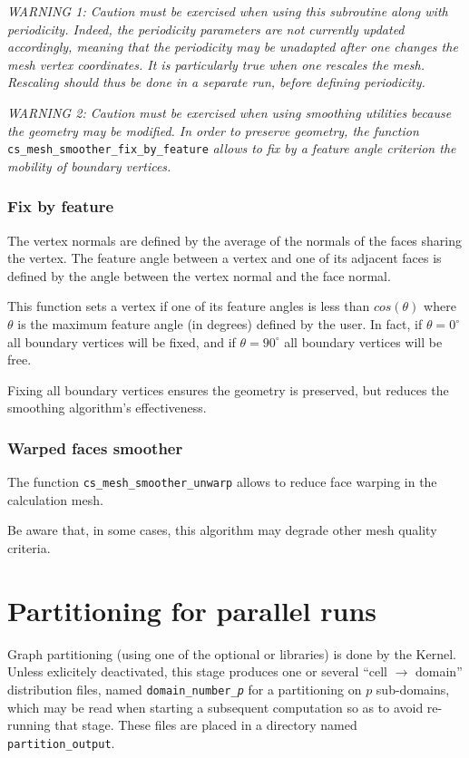 {{{\em WARNING 1: Caution must be exercised when using this subroutine
along with periodicity. Indeed, the periodicity parameters are not
currently updated accordingly, meaning that the periodicity may be
unadapted after one changes the mesh vertex coordinates. It is particularly
true when one rescales the mesh. Rescaling should thus be done
in a separate run, before defining periodicity.}

{\em WARNING 2: Caution must be exercised when using smoothing utilities
because the geometry may be modified. In order to preserve geometry,
the function} \texttt{cs\_mesh\_smoother\_fix\_by\_feature} {\em allows to 
fix by a feature angle criterion the mobility of boundary vertices.}

\subsubsection{Fix by feature}
The vertex normals are defined by the average of the normals of the
faces sharing the vertex.
The feature angle between a vertex and one of its adjacent faces is defined
by the angle between the vertex normal and the face normal.

This function sets a vertex if one of its feature angles is less than
$cos(\theta)$ where $\theta$ is the maximum feature angle (in degrees)
defined by the user.
In fact, if $\theta = 0^{\circ}$ all boundary vertices will be fixed, and 
if $\theta = 90^{\circ}$ all boundary vertices will be free.

Fixing all boundary vertices ensures the geometry is preserved, but reduces
the smoothing algorithm's effectiveness.

\subsubsection{Warped faces smoother}

The function \texttt{cs\_mesh\_smoother\_unwarp} allows to reduce face warping
in the calculation mesh.

Be aware that, in some cases, this algorithm may degrade other mesh quality 
criteria.

\section{Partitioning for parallel runs\label{sec:parall:part}}

Graph partitioning (using one of the optional \metis or
\scotch libraries) is done by the Kernel. Unless exlicitely
deactivated, this stage produces one or several ``cell $\rightarrow$ domain''
distribution files, named {\tt domain\_number\_\it{p}} for a partitioning on
$p$ sub-domains, which may be read when starting a subsequent computation so as
to avoid re-running that stage. These files are placed in a directory named
{\tt partition\_output}.

}}
